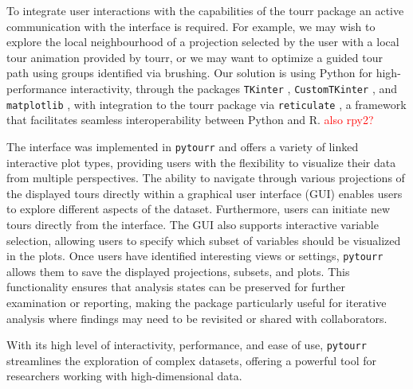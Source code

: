 \documentclass[article]{ajs}
\begin{document}
To integrate user interactions with the capabilities of the tourr package an active communication with the interface is required. For example, we may wish to explore the local neighbourhood of a projection selected by the user with a local tour animation provided by tourr, or we may want to optimize a guided tour path using groups identified via brushing.
Our solution is using Python for high-performance interactivity, through the packages \texttt{TKinter} \citep{lundh1999introduction}, \texttt{CustomTKinter} \citep{schimansky24}, and \texttt{matplotlib} \citep{Hunter:2007}, with integration to the tourr package \citep{tourr} via \texttt{reticulate} \citep{reticulate}, a framework that facilitates seamless interoperability between Python and R.
\textcolor{red}{also rpy2?}


The interface was implemented in \texttt{pytourr} and offers a variety of linked interactive plot types, providing users with the flexibility to visualize their data from multiple perspectives. The ability to navigate through various projections of the displayed tours directly within a graphical user interface (GUI) enables users to explore different aspects of the dataset. Furthermore, users can initiate new tours directly from the interface. The GUI also supports interactive variable selection, allowing users to specify which subset of variables should be visualized in the plots. Once users have identified interesting views or settings, \texttt{pytourr} allows them to save the displayed projections, subsets, and plots. This functionality ensures that analysis states can be preserved for further examination or reporting, making the package particularly useful for iterative analysis where findings may need to be revisited or shared with collaborators.

With its high level of interactivity, performance, and ease of use, \texttt{pytourr} streamlines the exploration of complex datasets, offering a powerful tool for researchers working with high-dimensional data.
\end{document}
